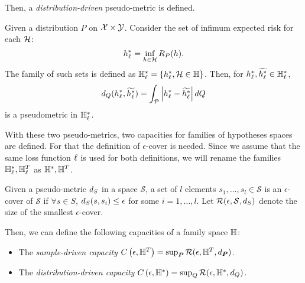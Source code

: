 Then, a \emph{distribution-driven} pseudo-metric is defined. 
\begin{definition}
    \label{def:dist_pseudometric}
    Given a distribution $P$ on $\mathcal{X} \times \mathcal{Y}$. Consider the set of infimum expected risk for each $\mathcal{H}$:
\begin{equation}
    \nonumber
    h_\ell^* = \inf_{h \in \mathcal{H}} R_P(h).
\end{equation}
The family of such sets is defined as 
$\mathbb{H}^{*}_\ell = \left\{h_\ell^*, \mathcal{H} \in \mathbb{H}\right\}$.
Then, for $h_\ell^*, \widetilde{h_\ell^*} \in \mathbb{H}_\ell^*$,
\begin{equation}
    \nonumber
    d_{Q}(h_\ell^*, \widetilde{h_\ell^*}) = \int_{\mathcal{P}} \left|h_\ell^* - \widetilde{h_\ell^*}\right| dQ
\end{equation}
is a pseudometric in $\mathbb{H}_\ell^*$.
\end{definition}
With these two pseudo-metrics, two capacities for families of hypotheses spaces are defined. For that the definition of $\epsilon$-cover is needed. 
Since we assume that the same loss function $\ell$ is used for both definitions, we will rename the families $\mathbb{H}^*_\ell, \mathbb{H}^T_\ell$ as $\mathbb{H}^*, \mathbb{H}^T$.
\begin{definition}
    \label{def:epsilon_cover}
    Given a pseudo-metric $d_{S}$ in a space $\mathcal{S}$, 
a set of $l$ elements $s_1, \ldots, s_l \in \mathcal{S}$ is an $\epsilon$-cover of $\mathcal{S}$ if 
$ \forall s \in S$, $d_{S}(s, s_i) \leq \epsilon $
for some $i=1, \ldots, l$.  Let $\mathcal{R}(\epsilon, \mathcal{S}, d_{S})$ denote the size of the smallest $\epsilon$-cover.
\end{definition}
%
Then, we can define the following capacities of a family space $\mathbb{H}$:
\begin{itemize}
    \item The \emph{sample-driven capacity} $C\left(\epsilon, \mathbb{H}^{T}\right) = \sup_{\bm{P}} \mathcal{R}(\epsilon, \mathbb{H}^T, d_{\bm{P}})$.
    \item The \emph{distribution-driven capacity} $C\left(\epsilon, \mathbb{H}^{*}\right) = \sup_Q \mathcal{R}(\epsilon, \mathbb{H}^{*}, d_{Q})$.
\end{itemize}

